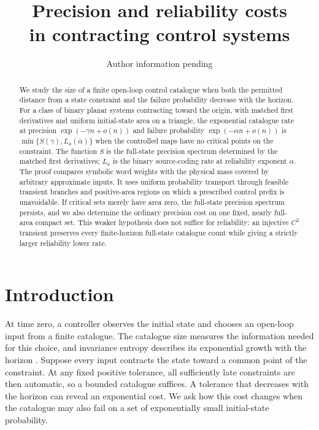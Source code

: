 \documentclass[11pt]{amsart}
\title[Precision and reliability costs]{Precision and reliability costs\\in contracting control systems}
\author{Author information pending}
\date{}
\theoremstyle{definition}
\theoremstyle{remark}
\numberwithin{equation}{section}
\begin{document}
\raggedbottom
\begin{abstract}
We study the size of a finite open-loop control catalogue when both
the permitted distance from a state constraint and the failure
probability decrease with the horizon. For a class of binary planar
systems contracting toward the origin, with matched first derivatives
and uniform initial-state area on a triangle, the exponential catalogue
rate at precision
$\exp(-\gamma n+o(n))$ and failure probability $\exp(-\alpha n+o(n))$
is $\min\{S(\gamma),L_a(\alpha)\}$ when the controlled maps
have no critical points on the constraint. The function $S$ is the
full-state precision spectrum determined by the matched first
derivatives; $L_a$ is the binary source-coding rate at reliability
exponent $\alpha$. The proof compares symbolic word weights with
the physical mass covered by arbitrary approximate inputs. It uses
uniform probability transport through feasible transient branches
and positive-area regions on which a prescribed control prefix is
unavoidable. If critical sets merely have area zero, the full-state
precision spectrum persists, and we also determine the ordinary
precision cost on one fixed, nearly full-area compact set. This weaker hypothesis
does not suffice for reliability: an injective $C^2$ transient
preserves every finite-horizon full-state catalogue count while
giving a strictly larger reliability lower rate.
\end{abstract}
\maketitle

\section{Introduction}
At time zero, a controller observes the initial state and chooses
an open-loop input from a finite catalogue. The catalogue size
measures the information needed for this choice, and invariance
entropy describes its exponential growth with the horizon
\cite{CK2009,Kawan2013}. Suppose every input contracts the state
toward a common point of the constraint. At any fixed positive
tolerance, all sufficiently late constraints are then automatic,
so a bounded catalogue suffices. A tolerance that decreases with
the horizon can reveal an exponential cost. We ask how this cost
changes when the catalogue may also fail on a set of exponentially
small initial-state probability.
\end{document}
